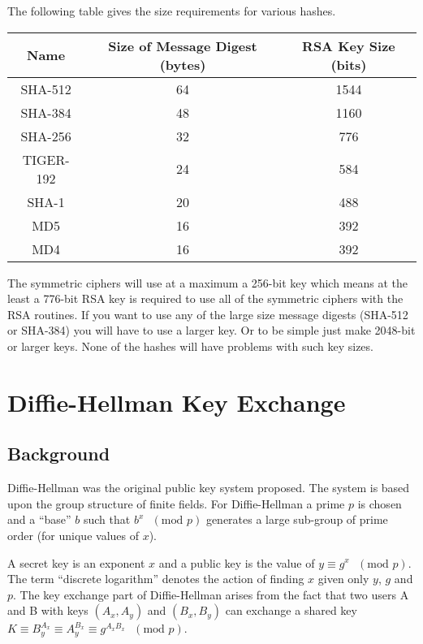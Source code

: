 \documentclass[b5paper]{book}
\begin{document}
The following table gives the size requirements for various hashes.
\begin{center}
\begin{tabular}{|c|c|c|}
      \hline Name & Size of Message Digest (bytes) & RSA Key Size (bits)\\
      \hline SHA-512 & 64 & 1544\\
      \hline SHA-384 & 48 & 1160 \\
      \hline SHA-256 & 32 & 776\\
      \hline TIGER-192 & 24 & 584\\
      \hline SHA-1 & 20 & 488\\
      \hline MD5 & 16 & 392\\
      \hline MD4 & 16 & 392\\
      \hline
\end{tabular}
\end{center}

The symmetric ciphers will use at a maximum a 256-bit key which means at the least a 776-bit RSA key is 
required to use all of the symmetric ciphers with the RSA routines. If you want to use any of the large size 
message digests (SHA-512 or SHA-384) you will have to use a larger key.  Or to be simple just make 2048-bit or larger
keys.  None of the hashes will have problems with such key sizes.

\chapter{Diffie-Hellman Key Exchange}

\section{Background}

Diffie-Hellman was the original public key system proposed.  The system is based upon the group structure
of finite fields.  For Diffie-Hellman a prime $p$ is chosen and a ``base'' $b$ such that $b^x\mbox{ }(\mbox{mod }p)$ 
generates a large sub-group of prime order (for unique values of $x$).

A secret key is an exponent $x$ and a public key is the value of $y \equiv g^x\mbox{ }(\mbox{mod }p)$.  The term
``discrete logarithm'' denotes the action of finding $x$ given only $y$, $g$ and $p$.  The key exchange part of
Diffie-Hellman arises from the fact that two users A and B with keys $(A_x, A_y)$ and $(B_x, B_y)$ can exchange 
a shared key $K \equiv B_y^{A_x} \equiv A_y^{B_x} \equiv g^{A_xB_x}\mbox{ }(\mbox{mod }p)$.
\end{document}
